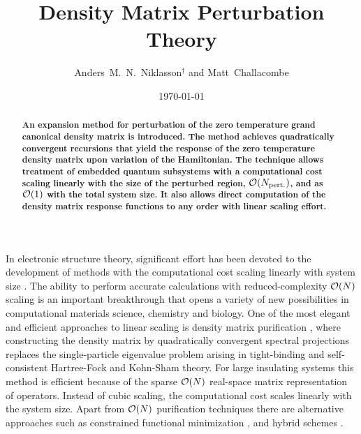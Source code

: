 
\draft
\tighten



\title{Density Matrix Perturbation Theory}

\author{Anders~M.~N.~Niklasson$^\dagger$  and Matt~Challacombe}

\address{Theoretical Division, Los Alamos National Laboratory,
Los Alamos, NM 87545, USA}

\date{\today}
\maketitle

\begin{abstract}
{\small \bf An expansion method for perturbation of the zero 
temperature grand canonical density matrix is introduced.
The method achieves quadratically convergent recursions that yield
the response of the zero temperature density matrix upon variation 
of the Hamiltonian. The technique allows treatment of embedded 
quantum subsystems with a computational cost scaling linearly 
with the size of the perturbed region, ${\cal O}(N_{\rm pert.})$, 
and as ${\cal O}(1)$ with the total system size. It also allows 
direct computation of the density matrix response functions to 
any order with linear scaling effort.}
\\

\end{abstract}

In electronic structure 
theory, significant effort has been devoted to the development of
methods with the computational cost scaling linearly with system size 
\cite{Goedecker_RMP_99,Wu02}. The ability to perform accurate calculations
with reduced-complexity ${\cal O}(N)$ scaling is an important breakthrough 
that opens a variety of new possibilities in computational materials science, 
chemistry and biology. One of the most elegant and efficient approaches 
to linear scaling is density matrix purification 
\cite{McWeeny60,Clinton69,Palser98,Holas01,NiklassonWLT,NiklassonSP2,NiklassonSP4},
where constructing the density matrix by quadratically convergent spectral projections 
replaces the single-particle eigenvalue problem arising in tight-binding and 
self-consistent Hartree-Fock and Kohn-Sham theory. For large insulating systems 
this method is efficient because of the sparse ${\cal O}(N)$ real-space matrix 
representation of operators.  Instead of cubic scaling, the computational cost 
scales linearly with the system size.  Apart from ${\cal O}(N)$ purification 
techniques there are alternative approaches such as constrained functional 
minimization \cite{Li93,Kohn96}, and hybrid schemes
\cite{Challa99,Bowler99,Daniels99,Helgaker2000,Head_Gordon2003}. 

